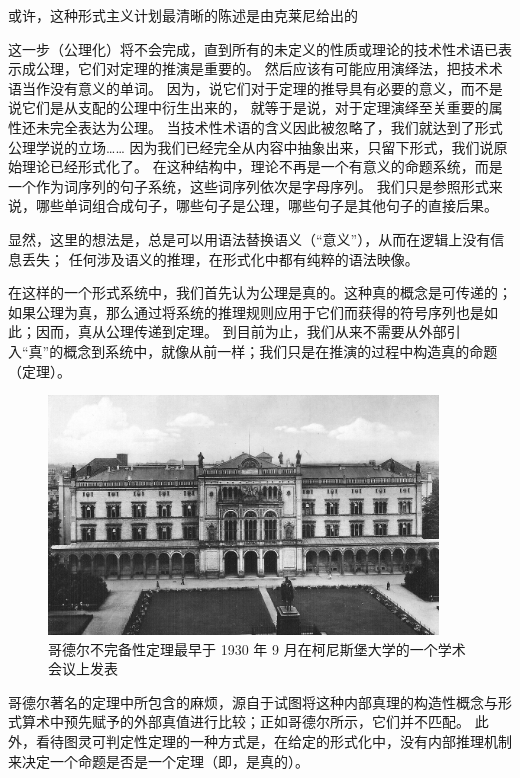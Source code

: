 \documentclass[a4paper,12pt]{article}
\begin{document}
或许，这种形式主义计划最清晰的陈述是由克莱尼给出的\cite{KleeneSC1952}

\begin{displayquote}
这一步（公理化）将不会完成，直到所有的未定义的性质或理论的技术性术语已表示成公理，它们对定理的推演是重要的。
然后应该有可能应用演绎法，把技术术语当作没有意义的单词。
因为，说它们对于定理的推导具有必要的意义，而不是说它们是从支配的公理中衍生出来的，
就等于是说，对于定理演绎至关重要的属性还未完全表达为公理。
当技术性术语的含义因此被忽略了，我们就达到了形式公理学说的立场……
因为我们已经完全从内容中抽象出来，只留下形式，我们说原始理论已经形式化了。
在这种结构中，理论不再是一个有意义的命题系统，而是一个作为词序列的句子系统，这些词序列依次是字母序列。
我们只是参照形式来说，哪些单词组合成句子，哪些句子是公理，哪些句子是其他句子的直接后果。
\end{displayquote}

显然，这里的想法是，总是可以用语法替换语义（“意义”），从而在逻辑上没有信息丢失；
任何涉及语义的推理，在形式化中都有纯粹的语法映像。

在这样的一个形式系统中，我们首先认为公理是真的。这种真的概念是可传递的；
如果公理为真，那么通过将系统的推理规则应用于它们而获得的符号序列也是如此；因而，真从公理传递到定理。
到目前为止，我们从来不需要从外部引入“真”的概念到系统中，就像从前一样；我们只是在推演的过程中构造真的命题（定理）。

\begin{figure}[ht]
\centering
\includegraphics[height=2.5in]{images/konigsberger_university.jpg}
\caption{哥德尔不完备性定理最早于 1930 年 9 月在柯尼斯堡大学的一个学术会议上发表}
\end{figure}

哥德尔著名的定理\cite{GodelK1931}中所包含的麻烦，源自于试图将这种内部真理的构造性概念与形式算术中预先赋予的外部真值进行比较；正如哥德尔所示，它们并不匹配。
此外，看待图灵可判定性定理\cite{TuringA1937}的一种方式是，在给定的形式化中，没有内部推理机制来决定一个命题是否是一个定理（即，是真的）。
\end{document}
